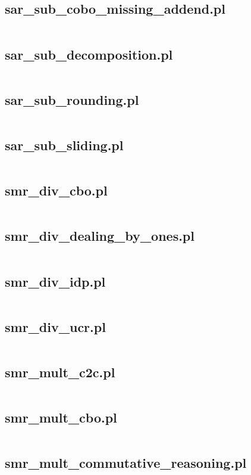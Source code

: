 \documentclass{article}
\begin{document}
\subsection{sar\_sub\_cobo\_missing\_addend.pl}
\inputminted{prolog}{sar_sub_cobo_missing_addend.pl}
\subsection{sar\_sub\_decomposition.pl}
\inputminted{prolog}{sar_sub_decomposition.pl}
\subsection{sar\_sub\_rounding.pl}
\inputminted{prolog}{sar_sub_rounding.pl}
\subsection{sar\_sub\_sliding.pl}
\inputminted{prolog}{sar_sub_sliding.pl}
\subsection{smr\_div\_cbo.pl}
\inputminted{prolog}{smr_div_cbo.pl}
\subsection{smr\_div\_dealing\_by\_ones.pl}
\inputminted{prolog}{smr_div_dealing_by_ones.pl}
\subsection{smr\_div\_idp.pl}
\inputminted{prolog}{smr_div_idp.pl}
\subsection{smr\_div\_ucr.pl}
\inputminted{prolog}{smr_div_ucr.pl}
\subsection{smr\_mult\_c2c.pl}
\inputminted{prolog}{smr_mult_c2c.pl}
\subsection{smr\_mult\_cbo.pl}
\inputminted{prolog}{smr_mult_cbo.pl}
\subsection{smr\_mult\_commutative\_reasoning.pl}
\inputminted{prolog}{smr_mult_commutative_reasoning.pl}
\end{document}
